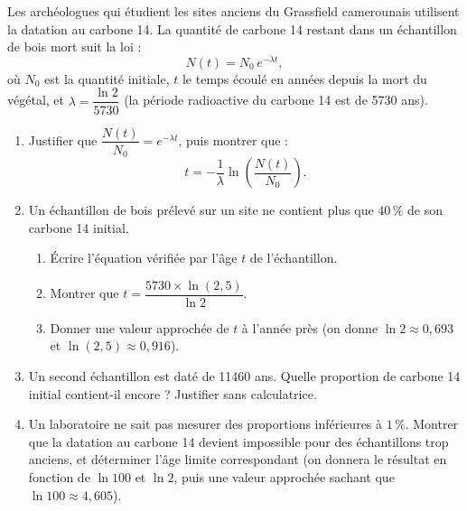 \documentclass[11pt]{article}
\begin{document}
\begin{exercice}
Les archéologues qui étudient les sites anciens du Grassfield camerounais utilisent la datation au carbone 14. La quantité de carbone 14 restant dans un échantillon de bois mort suit la loi :
\[ N(t)=N_0\,e^{-\lambda t}, \]
où $N_0$ est la quantité initiale, $t$ le temps écoulé en années depuis la mort du végétal, et $\lambda=\dfrac{\ln 2}{5730}$ (la période radioactive du carbone 14 est de \num{5730} ans).

\begin{enumerate}
\item Justifier que $\dfrac{N(t)}{N_0}=e^{-\lambda t}$, puis montrer que :
\[ t=-\dfrac{1}{\lambda}\ln\!\left(\dfrac{N(t)}{N_0}\right). \]
\item Un échantillon de bois prélevé sur un site ne contient plus que $40\,\%$ de son carbone 14 initial.
\begin{enumerate}
\item Écrire l'équation vérifiée par l'âge $t$ de l'échantillon.
\item Montrer que $t=\dfrac{5730\times\ln(2{,}5)}{\ln 2}$.
\item Donner une valeur approchée de $t$ à l'année près (on donne $\ln 2\approx 0,693$ et $\ln(2{,}5)\approx 0,916$).
\end{enumerate}
\item Un second échantillon est daté de \num{11460} ans. Quelle proportion de carbone 14 initial contient-il encore ? Justifier sans calculatrice.
\item Un laboratoire ne sait pas mesurer des proportions inférieures à $1\,\%$. Montrer que la datation au carbone 14 devient impossible pour des échantillons trop anciens, et déterminer l'âge limite correspondant (on donnera le résultat en fonction de $\ln 100$ et $\ln 2$, puis une valeur approchée sachant que $\ln 100\approx 4,605$).
\end{enumerate}
\end{exercice}
\end{document}
